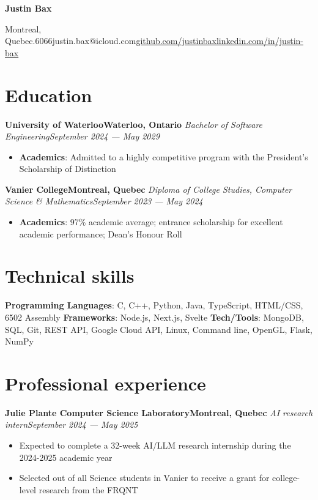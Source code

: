 \documentclass{article}
\newcommand{\cdelim}{\;\textbar\;}
\newcommand{\newrole}[4]{
    {\normalfont\bfseries #1\hfill#3}
    \newline
    \textit{#2}\hfill\textit{#4}
}
\newenvironment{bulletpoints}{\begin{itemize}\setlength\itemsep{-0.3em}}{\end{itemize}}
\begin{document}
\begin{center}
    {\Huge\bfseries Justin Bax}\\\vspace*{2pt}

    Montreal, Quebec\cdelim 438.763.6066\cdelim justin.bax@icloud.com\cdelim\href{https://github.com/justinbax}{github.com/justinbax}\cdelim\href{https://linkedin.com/in/justin-bax}{linkedin.com/in/justin-bax}\\
\end{center}

\section*{Education}

\newrole{University of Waterloo}{Bachelor of Software Engineering}{Waterloo, Ontario}{September 2024 --- May 2029}
\begin{bulletpoints}
    \item {\bfseries Academics}: Admitted to a highly competitive program with the President's Scholarship of Distinction
\end{bulletpoints}

\newrole{Vanier College}{Diploma of College Studies, Computer Science \& Mathematics}{Montreal, Quebec}{September 2023 --- May 2024}
\begin{bulletpoints}
    \item {\bfseries Academics}: 97\% academic average; entrance scholarship for excellent academic performance; Dean’s Honour Roll
\end{bulletpoints}


\section*{Technical skills}

{\bfseries Programming Languages}: C, C++, Python, Java, TypeScript, HTML/CSS, 6502 Assembly
\newline
{\bfseries Frameworks}: Node.js, Next.js, Svelte
\newline
{\bfseries Tech/Tools}: MongoDB, SQL, Git, REST API, Google Cloud API, Linux, Command line, OpenGL, Flask, NumPy


\section*{Professional experience}

\newrole{Julie Plante Computer Science Laboratory}{AI research intern}{Montreal, Quebec}{September 2024 --- May 2025}
\begin{bulletpoints}
    \item Expected to complete a 32-week AI/LLM research internship during the 2024-2025 academic year
    \item Selected out of all Science students in Vanier to receive a grant for college-level research from the FRQNT
\end{bulletpoints}
\end{document}
